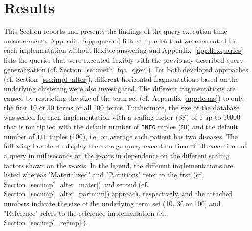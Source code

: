 
\section{Results}
\label{sec:res}

This Section reports and presents the findings of the query execution time measurements. Appendix~\ref{app:queries} lists all queries that were executed
for each implementation without flexible answering and Appendix~\ref{app:flexqueries} lists the queries that were executed flexibly with the previously
described query generalization (cf. Section~\ref{sec:meth_fqa_qgen}). For both developed approaches (cf. Section~\ref{sec:impl_alter}), different horizontal
fragmentations based on the underlying clustering were also investigated. The different fragmentations are caused by restricting the size of the term set 
(cf. Appendix~\ref{app:terms}) to only the first 10 or 30 terms or all 100 terms. Furthermore, the size of the database was scaled for each implementation with
a scaling factor (SF) of 1 up to 10000 that is multiplied with the default number of \verb!INFO! tuples (50) and the default number of \verb!ILL! tuples (100),
i.e. on average each patient has two diseases.
The following bar charts display the average query execution time of 10 executions of a query in milliseconds on the y-axis in dependence on the different 
scaling factors shown on the x-axis. In the legend, the different implementations are listed whereas
"Materialized" and "Partitions" refer to the first (cf. Section~\ref{sec:impl_alter_mater}) and second (cf. Section~\ref{sec:impl_alter_partnum}) approach,
respectively, and the attached numbers indicate the size of the underlying term set (10, 30 or 100) and "Reference" refers to the reference implementation 
(cf. Section~\ref{sec:impl_refimpl}).

